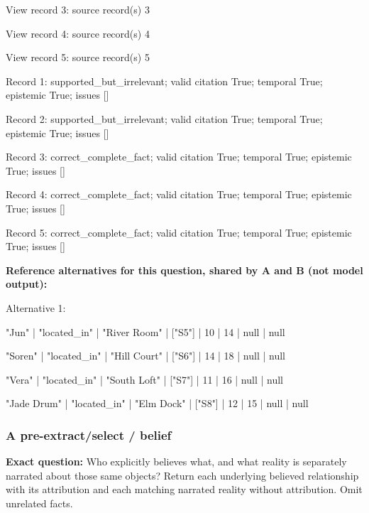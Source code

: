 View record 3: source record(s) 3\par

View record 4: source record(s) 4\par

View record 5: source record(s) 5\par

Record 1: supported\_but\_irrelevant; valid citation True; temporal True; epistemic True; issues []\par

Record 2: supported\_but\_irrelevant; valid citation True; temporal True; epistemic True; issues []\par

Record 3: correct\_complete\_fact; valid citation True; temporal True; epistemic True; issues []\par

Record 4: correct\_complete\_fact; valid citation True; temporal True; epistemic True; issues []\par

Record 5: correct\_complete\_fact; valid citation True; temporal True; epistemic True; issues []\par

\noindent\textbf{Reference alternatives for this question, shared by A and B (not model output):}

\noindent Alternative 1:

"Jun" | "located\_in" | "River Room" | ["S5"] | 10 | 14 | null | null\par\smallskip

"Soren" | "located\_in" | "Hill Court" | ["S6"] | 14 | 18 | null | null\par\smallskip

"Vera" | "located\_in" | "South Loft" | ["S7"] | 11 | 16 | null | null\par\smallskip

"Jade Drum" | "located\_in" | "Elm Dock" | ["S8"] | 12 | 15 | null | null\par\smallskip

\subsubsection*{A pre-extract/select / belief}

\noindent\textbf{Exact question:} Who explicitly believes what, and what reality is separately narrated about those same objects? Return each underlying believed relationship with its attribution and each matching narrated reality without attribution. Omit unrelated facts.\par


